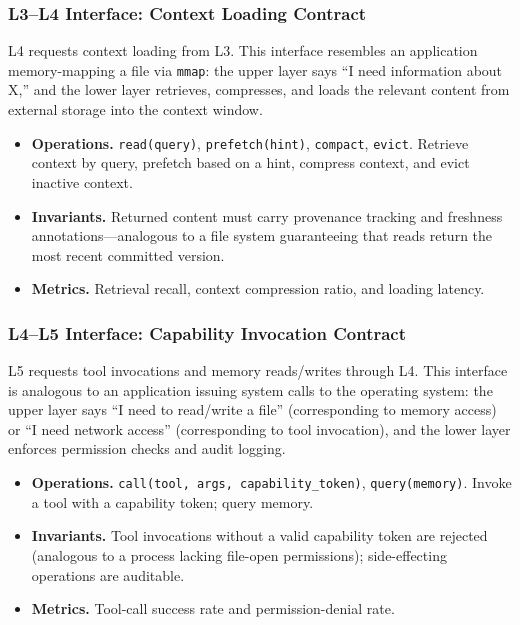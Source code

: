 \documentclass[11pt,a4paper]{article}
\begin{document}
\subsubsection{L3--L4 Interface: Context Loading Contract}

L4 requests context loading from L3. This interface resembles an application memory-mapping a file via \texttt{mmap}: the upper layer says ``I need information about X,'' and the lower layer retrieves, compresses, and loads the relevant content from external storage into the context window.

\begin{itemize}[nosep]
\item \textbf{Operations.}
\texttt{read(query)}, \texttt{prefetch(hint)}, \texttt{compact}, \texttt{evict}.
Retrieve context by query, prefetch based on a hint, compress context, and evict inactive context.
\item \textbf{Invariants.}
Returned content must carry provenance tracking and freshness annotations---analogous to a file system guaranteeing that reads return the most recent committed version.
\item \textbf{Metrics.}
Retrieval recall, context compression ratio, and loading latency.
\end{itemize}

\subsubsection{L4--L5 Interface: Capability Invocation Contract}

L5 requests tool invocations and memory reads/writes through L4. This interface is analogous to an application issuing system calls to the operating system: the upper layer says ``I need to read/write a file'' (corresponding to memory access) or ``I need network access'' (corresponding to tool invocation), and the lower layer enforces permission checks and audit logging.

\begin{itemize}[nosep]
\item \textbf{Operations.}
\texttt{call(tool, args, capability\_token)}, \texttt{query(memory)}.
Invoke a tool with a capability token; query memory.
\item \textbf{Invariants.}
Tool invocations without a valid capability token are rejected (analogous to a process lacking file-open permissions); side-effecting operations are auditable\cite{debenedetti2025camel}.
\item \textbf{Metrics.}
Tool-call success rate and permission-denial rate.
\end{itemize}
\end{document}
